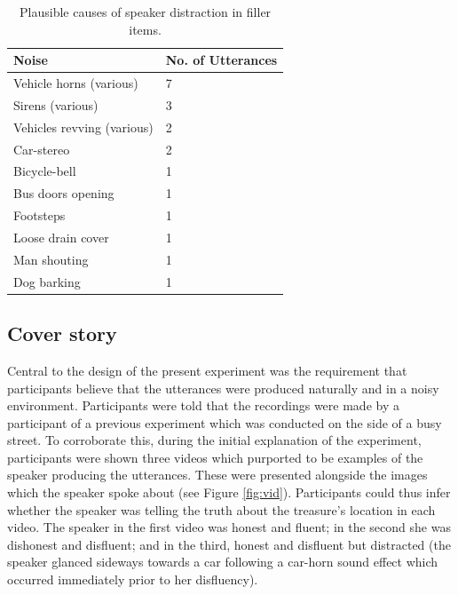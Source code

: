 \documentclass[a4paper,man,natbib]{apa6}
\begin{document}
\begin{table}
\caption{Plausible causes of speaker distraction in filler items.}
\label{table:fillernoise}
\begin{tabularx}{\linewidth}{YY}
\hline
Noise & No. of Utterances\\
\hline
Vehicle horns (various) & 7 \\
Sirens (various) & 3 \\
Vehicles revving (various) & 2 \\
Car-stereo & 2 \\
Bicycle-bell & 1 \\
Bus doors opening & 1 \\
Footsteps & 1 \\
Loose drain cover & 1 \\
Man shouting & 1 \\
Dog barking & 1 \\
\hline
\end{tabularx}
\end{table}

\subsection{Cover story}
Central to the design of the present experiment was the requirement that participants believe that the utterances were produced naturally and in a noisy environment. 
Participants were told that the recordings were made by a participant of a previous experiment which was conducted on the side of a busy street. 
To corroborate this, during the initial explanation of the experiment, participants were shown three videos which purported to be examples of the speaker producing the utterances. 
These were presented alongside the images which the speaker spoke about (see Figure \ref{fig:vid}). 
Participants could thus infer whether the speaker was telling the truth about the treasure's location in each video.
The speaker in the first video was honest and fluent; in the second she was dishonest and disfluent; and in the third, honest and disfluent but distracted (the speaker glanced sideways towards a car following a car-horn sound effect which occurred immediately prior to her disfluency).
\end{document}
